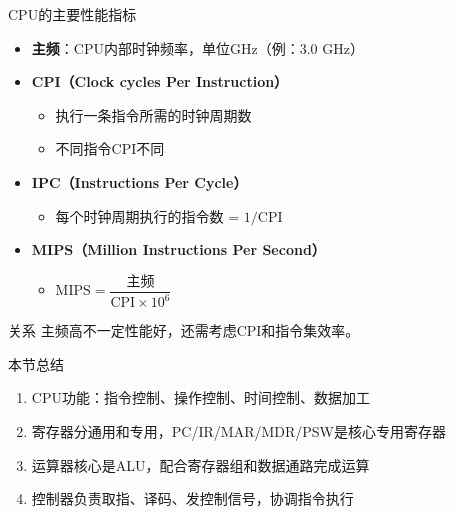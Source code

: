 \documentclass[10pt, aspectratio=169]{beamer}
\begin{document}
\begin{frame}{CPU的主要性能指标}
    \begin{itemize}
        \item \textbf{主频}：CPU内部时钟频率，单位GHz（例：3.0 GHz）
        \item \textbf{CPI（Clock cycles Per Instruction）}
            \begin{itemize}
                \item 执行一条指令所需的时钟周期数
                \item 不同指令CPI不同
            \end{itemize}
        \item \textbf{IPC（Instructions Per Cycle）}
            \begin{itemize}
                \item 每个时钟周期执行的指令数 = $1/\text{CPI}$
            \end{itemize}
        \item \textbf{MIPS（Million Instructions Per Second）}
            \begin{itemize}
                \item $\text{MIPS} = \dfrac{\text{主频}}{\text{CPI} \times 10^6}$
            \end{itemize}
    \end{itemize}
    \vspace{0.3em}
    \begin{block}{关系}
        主频高不一定性能好，还需考虑CPI和指令集效率。
    \end{block}
\end{frame}

\begin{frame}{本节总结}
    \begin{enumerate}
        \item CPU功能：指令控制、操作控制、时间控制、数据加工
        \item 寄存器分通用和专用，PC/IR/MAR/MDR/PSW是核心专用寄存器
        \item 运算器核心是ALU，配合寄存器组和数据通路完成运算
        \item 控制器负责取指、译码、发控制信号，协调指令执行
    \end{enumerate}
\end{frame}
\end{document}
